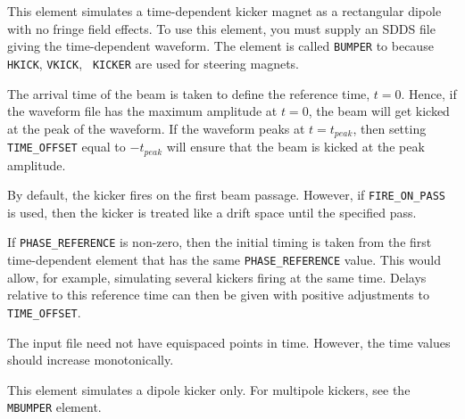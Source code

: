 This element simulates a time-dependent kicker magnet as a rectangular
dipole with no fringe field effects.  To use this element, you must
supply an SDDS file giving the time-dependent waveform.  The element
is called {\tt BUMPER} to because {\tt HKICK}, {\tt VKICK}, {\tt
KICKER} are used for steering magnets.

The arrival time of the beam is taken to define the reference time,
$t=0$.  Hence, if the waveform file has the maximum amplitude at
$t=0$, the beam will get kicked at the peak of the waveform.  If the waveform
peaks at $t=t_{peak}$, then setting {\tt TIME_OFFSET} equal to $-t_{peak}$
will ensure that the beam is kicked at the peak amplitude.

By default, the kicker fires on the first beam passage.  However, if 
{\tt FIRE_ON_PASS} is used, then the kicker is treated like a drift space until
the specified pass.

If \verb|PHASE_REFERENCE| is non-zero, then the initial timing is
taken from the first time-dependent element that has the same
\verb|PHASE_REFERENCE| value.  This would allow, for example,
simulating several kickers firing at the same time.  Delays relative
to this reference time can then be given with positive adjustments to
{\tt TIME_OFFSET}.

The input file need not have equispaced points in time.  However, the
time values should increase monotonically.

This element simulates a dipole kicker only.  For multipole kickers, see the
{\tt MBUMPER} element.